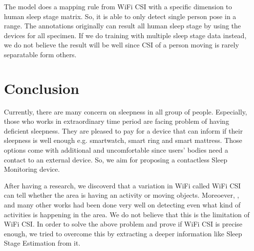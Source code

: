 \documentclass[10pt,letterpaper]{article}
\begin{document}
	The model does a mapping rule from WiFi CSI with a specific dimension to human sleep stage matrix. So, it is able to only detect single person pose in a range. The annotations originally can result all human sleep stage by using the devices for all specimen. If we do training with multiple sleep stage data instead, we do not believe the result will be well since CSI of a person moving is rarely separatable form others.
	

	
	\section*{Conclusion}
	

	Currently, there are many concern on sleepness in all group of people. Especially, those who works in extraordinary time period are facing problem of having deficient sleepness. They are pleased to pay for a device that can inform if their sleepness is well enough e.g. smartwatch, smart ring and smart mattress. Those options come with additional and uncomfortable since users' bodies need a contact to an external device. So, we aim for proposing a contactless Sleep Monitoring device.
	
	After having a research, we discoverd that a variation in WiFi called WiFi CSI can tell whether the area is having an activity or moving objects. Moreoever, \cite{chowdhuryTZ}, \cite{zouH} and many other works had been done very well on detecting even what kind of activities is happening in the area. We do not believe that this is the limitation of WiFi CSI. In order to solve the above problem and prove if WiFi CSI is precise enough, we tried to overcome this by extracting a deeper information like Sleep Stage Estimation from it. 
	
\end{document}
